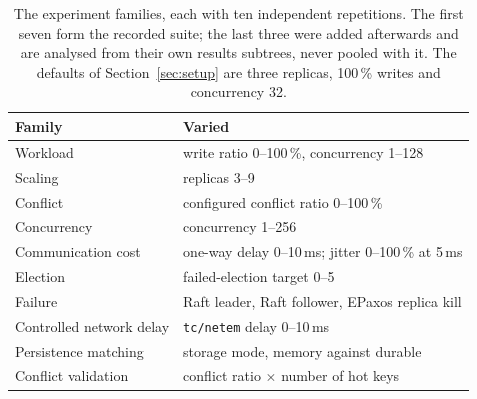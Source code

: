 \begin{table}[t]
\caption{The experiment families, each with ten independent repetitions. The
first seven form the recorded suite; the last three were added afterwards
and are analysed from their own results subtrees, never pooled with it.
The defaults of Section~\ref{sec:setup} are three replicas, 100\,\% writes
and concurrency 32.}
\label{tab:suite}
\footnotesize
\setlength{\tabcolsep}{3pt}
\begin{tabular}{@{}l>{\raggedright\arraybackslash}p{}@{}}
\toprule
Family & Varied \\
\midrule
Workload & write ratio 0--100\,\%, concurrency 1--128 \\
Scaling & replicas 3--9 \\
Conflict & configured conflict ratio 0--100\,\% \\
Concurrency & concurrency 1--256 \\
Communication cost & one-way delay 0--10\,ms; jitter 0--100\,\% at 5\,ms \\
Election & failed-election target 0--5 \\
Failure & Raft leader, Raft follower, EPaxos replica kill \\
\midrule
Controlled network delay & \texttt{tc/netem} delay 0--10\,ms \\
Persistence matching & storage mode, memory against durable \\
Conflict validation & conflict ratio $\times$ number of hot keys \\
\bottomrule
\end{tabular}
\end{table}
